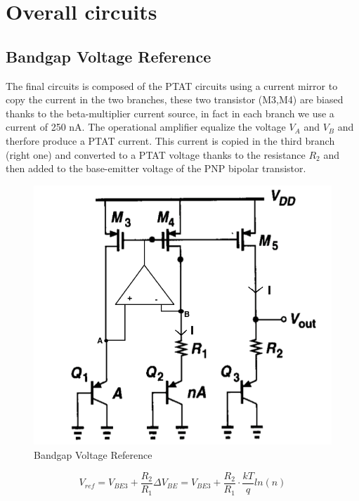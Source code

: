 \documentclass[11pt,a4paper]{report}
\begin{document}
\section{Overall circuits}
\subsection{Bandgap Voltage Reference}

The final circuits is composed of the PTAT circuits using a current mirror to copy the current in the two branches, these two transistor (M3,M4) are biased thanks to the beta-multiplier current source, in fact in each branch we use a current of 250 nA. The operational amplifier equalize the voltage $V_A$ and $V_B$ and therfore produce a PTAT current. This current is copied in the third branch (right one) and converted to a PTAT voltage thanks to the resistance $R_2$ and then added to the base-emitter voltage of the PNP bipolar transistor. 

\begin{figure}[h]
  \begin{center}
    \includegraphics[scale=0.5]{photo/bandgap_3pnp}
  \end{center}
  \caption{Bandgap Voltage Reference}
  \label{bandgap_3pnp}
\end{figure}

\begin{equation}
  V_{ref} = V_{BE3} + \frac{R_2}{R_1} \Delta V_{BE} = V_{BE3} + \frac{R_2}{R_1} \cdot \frac{kT}{q}ln(n)
\end{equation}
\end{document}
